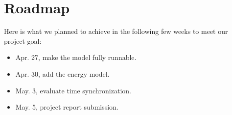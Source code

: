
\section{Roadmap}
\label{sec:roadmap}

Here is what we planned to achieve in the following few weeks to meet our project goal:
\begin{itemize}
\item Apr. 27, make the model fully runnable.
\item Apr. 30, add the energy model.
\item May. 3, evaluate time synchronization.
\item May. 5, project report submission.
\end{itemize}



